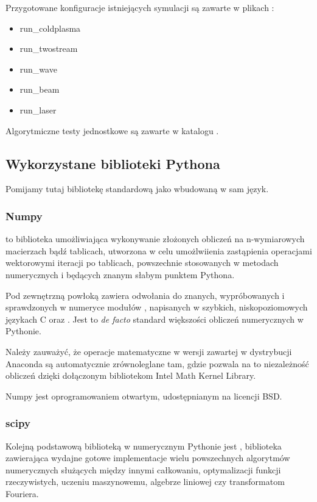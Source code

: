 Przygotowane konfiguracje istniejących symulacji są zawarte w plikach
: 
\begin{itemize}
    \item run\_coldplasma
    \item run\_twostream
    \item run\_wave
    \item run\_beam
    \item run\_laser
\end{itemize}

Algorytmiczne testy jednostkowe są zawarte w katalogu .

\subsection{Wykorzystane biblioteki Pythona}

Pomijamy tutaj bibliotekę standardową jako wbudowaną w sam język.

\subsubsection{Numpy}
\cite{numpy} to biblioteka umożliwiająca wykonywanie złożonych obliczeń na
n-wymiarowych macierzach bądź tablicach, utworzona w celu umożlwiienia
zastąpienia operacjami wektorowymi iteracji po tablicach, powszechnie
stosowanych w metodach numerycznych i będących znanym słabym punktem
Pythona.

Pod zewnętrzną powłoką zawiera odwołania do znanych, wypróbowanych i
sprawdzonych w numeryce modułów ,  napisanych w
szybkich, niskopoziomowych językach C oraz .  Jest to
\emph{de facto} standard większości obliczeń numerycznych w Pythonie.

Należy zauważyć, że operacje matematyczne w wersji  zawartej
w dystrybucji Anaconda są automatycznie
zrównoleglane tam, gdzie pozwala na to
niezależność obliczeń dzięki dołączonym bibliotekom Intel Math Kernel Library.\cite{intel-mkl} 

Numpy jest oprogramowaniem otwartym, udostępnianym na licencji BSD.


\subsubsection{scipy}
Kolejną podstawową biblioteką w numerycznym Pythonie jest \cite{scipy},
biblioteka zawierająca wydajne gotowe implementacje wielu powszechnych algorytmów
numerycznych służących między innymi całkowaniu, optymalizacji funkcji rzeczywistych,
uczeniu maszynowemu, algebrze liniowej czy transformatom Fouriera.

